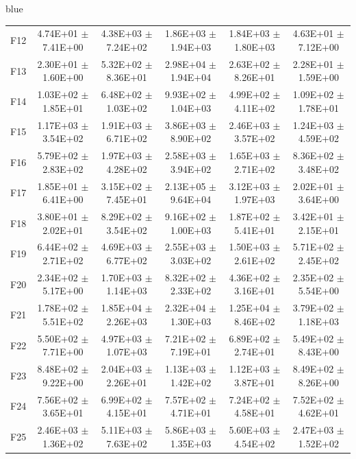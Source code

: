 \documentclass[journal, onecolumn]{IEEEtran}
\begin{document}
\begin{color}{blue}
\begin{table}[htbp!]
\begin{tabular}{c|ccccc}
		F12	 &	4.74E+01	$\pm$	7.41E+00	 &	4.38E+03	$\pm$	7.24E+02		 &	1.86E+03	$\pm$	1.94E+03		 &	1.84E+03	$\pm$	1.80E+03		 &	4.63E+01	$\pm$	7.12E+00	\\	
		F13	 &	2.30E+01	$\pm$	1.60E+00	 &	5.32E+02	$\pm$	8.36E+01		 &	2.98E+04	$\pm$	1.94E+04		 &	2.63E+02	$\pm$	8.26E+01		 &	2.28E+01	$\pm$	1.59E+00	\\	
		F14	 &	1.03E+02	$\pm$	1.85E+01	 &	6.48E+02	$\pm$	1.03E+02		 &	9.93E+02	$\pm$	1.04E+03		 &	4.99E+02	$\pm$	4.11E+02		 &	1.09E+02	$\pm$	1.78E+01	\\	
		F15	 &	1.17E+03	$\pm$	3.54E+02	 &	1.91E+03	$\pm$	6.71E+02		 &	3.86E+03	$\pm$	8.90E+02		 &	2.46E+03	$\pm$	3.57E+02		 &	1.24E+03	$\pm$	4.59E+02	\\	
		F16	 &	5.79E+02	$\pm$	2.83E+02	 &	1.97E+03	$\pm$	4.28E+02		 &	2.58E+03	$\pm$	3.94E+02		 &	1.65E+03	$\pm$	2.71E+02		 &	8.36E+02	$\pm$	3.48E+02	\\	
		F17	 &	1.85E+01	$\pm$	6.41E+00	 &	3.15E+02	$\pm$	7.45E+01		 &	2.13E+05	$\pm$	9.64E+04		 &	3.12E+03	$\pm$	1.97E+03		 &	2.02E+01	$\pm$	3.64E+00	\\	
		F18	 &	3.80E+01	$\pm$	2.02E+01	 &	8.29E+02	$\pm$	3.54E+02		 &	9.16E+02	$\pm$	1.00E+03		 &	1.87E+02	$\pm$	5.41E+01		 &	3.42E+01	$\pm$	2.15E+01	\\	
		F19	 &	6.44E+02	$\pm$	2.71E+02	 &	4.69E+03	$\pm$	6.77E+02		 &	2.55E+03	$\pm$	3.03E+02		 &	1.50E+03	$\pm$	2.61E+02		 &	5.71E+02	$\pm$	2.45E+02	\\	
		F20	 &	2.34E+02	$\pm$	5.17E+00	 &	1.70E+03	$\pm$	1.14E+03		 &	8.32E+02	$\pm$	2.33E+02		 &	4.36E+02	$\pm$	3.16E+01		 &	2.35E+02	$\pm$	5.54E+00	\\	
		F21	 &	1.78E+02	$\pm$	5.51E+02	 &	1.85E+04	$\pm$	2.26E+03		 &	2.32E+04	$\pm$	1.30E+03		 &	1.25E+04	$\pm$	8.46E+02		 &	3.79E+02	$\pm$	1.18E+03	\\	
		F22	 &	5.50E+02	$\pm$	7.71E+00	 &	4.97E+03	$\pm$	1.07E+03		 &	7.21E+02	$\pm$	7.19E+01		 &	6.89E+02	$\pm$	2.74E+01		 &	5.49E+02	$\pm$	8.43E+00	\\	
		F23	 &	8.48E+02	$\pm$	9.22E+00	 &	2.04E+03	$\pm$	2.26E+01		 &	1.13E+03	$\pm$	1.42E+02		 &	1.12E+03	$\pm$	3.87E+01		 &	8.49E+02	$\pm$	8.26E+00	\\	
		F24	 &	7.56E+02	$\pm$	3.65E+01	 &	6.99E+02	$\pm$	4.15E+01		 &	7.57E+02	$\pm$	4.71E+01		 &	7.24E+02	$\pm$	4.58E+01		 &	7.52E+02	$\pm$	4.62E+01	\\	
		F25	 &	2.46E+03	$\pm$	1.36E+02	 &	5.11E+03	$\pm$	7.63E+02		 &	5.86E+03	$\pm$	1.35E+03		 &	5.60E+03	$\pm$	4.54E+02		 &	2.47E+03	$\pm$	1.52E+02	\\	

\end{tabular}
\end{table}
\end{color}
\end{document}
